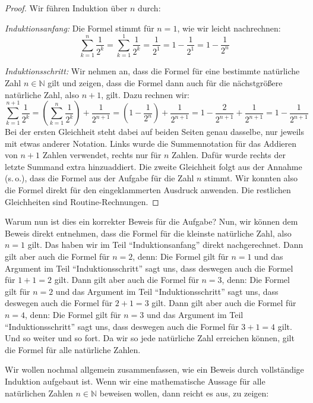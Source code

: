 \documentclass[a4paper,ngerman,12pt]{scrartcl}
\newcommand{\N}{\mathbb{N}}
\theoremstyle{definition}
\begin{document}
\begin{proof}
  Wir führen Induktion über $n$ durch:

  \emph{Induktionsanfang:} Die Formel stimmt für $n=1$, wie wir leicht nachrechnen:
  \[ \sum_{k=1}^n \frac{1}{2^k} = \sum_{k=1}^1 \frac{1}{2^k} = \frac{1}{2^1} = 1 - \frac{1}{2^1} = 1 - \frac{1}{2^n} \]

  \emph{Induktionsschritt:} Wir nehmen an, dass die Formel für eine bestimmte natürliche Zahl $n \in \N$ gilt und zeigen, dass die Formel dann auch für die nächstgrößere natürliche Zahl, also $n{+}1$, gilt. Dazu rechnen wir:
  \[ \sum_{k=1}^{n+1} \frac{1}{2^k} = \left( \sum_{k=1}^{n} \frac{1}{2^k} \right) + \frac{1}{2^{n+1}} = \left( 1 - \frac{1}{2^n} \right) + \frac{1}{2^{n+1}} = 1 - \frac{2}{2^{n+1}} + \frac{1}{2^{n+1}} = 1 - \frac{1}{2^{n+1}} \]
  Bei der ersten Gleichheit steht dabei auf beiden Seiten genau dasselbe, nur jeweils mit etwas anderer Notation. Links wurde die Summennotation für das Addieren von $n+1$ Zahlen verwendet, rechts nur für $n$ Zahlen. Dafür wurde rechts der letzte Summand extra hinzuaddiert. Die zweite Gleichheit folgt aus der Annahme (s.\,o.), dass die Formel aus der Aufgabe für die Zahl $n$ stimmt. Wir konnten also die Formel direkt für den eingeklammerten Ausdruck anwenden. Die restlichen Gleichheiten sind Routine-Rechnungen.
\end{proof}

Warum nun ist dies ein korrekter Beweis für die Aufgabe? Nun, wir können dem Beweis direkt entnehmen, dass die Formel für die kleinste natürliche Zahl, also $n=1$ gilt. Das haben wir im Teil "`Induktionsanfang"' direkt nachgerechnet. Dann gilt aber auch die Formel für $n=2$, denn: Die Formel gilt für $n=1$ und das Argument im Teil "`Induktionsschritt"' sagt uns, dass deswegen auch die Formel für $1+1=2$ gilt. Dann gilt aber auch die Formel für $n=3$, denn: Die Formel gilt für $n=2$ und das Argument im Teil "`Induktionsschritt"' sagt uns, dass deswegen auch die Formel für $2+1=3$ gilt. Dann gilt aber auch die Formel für $n=4$, denn: Die Formel gilt für $n=3$ und das Argument im Teil "`Induktionsschritt"' sagt uns, dass deswegen auch die Formel für $3+1=4$ gilt. Und so weiter und so fort. Da wir so jede natürliche Zahl erreichen können, gilt die Formel für alle natürliche Zahlen.

Wir wollen nochmal allgemein zusammenfassen, wie ein Beweis durch vollständige Induktion aufgebaut ist. Wenn wir eine mathematische Aussage für alle natürlichen Zahlen $n \in \N$ beweisen wollen, dann reicht es aus, zu zeigen:
\end{document}

